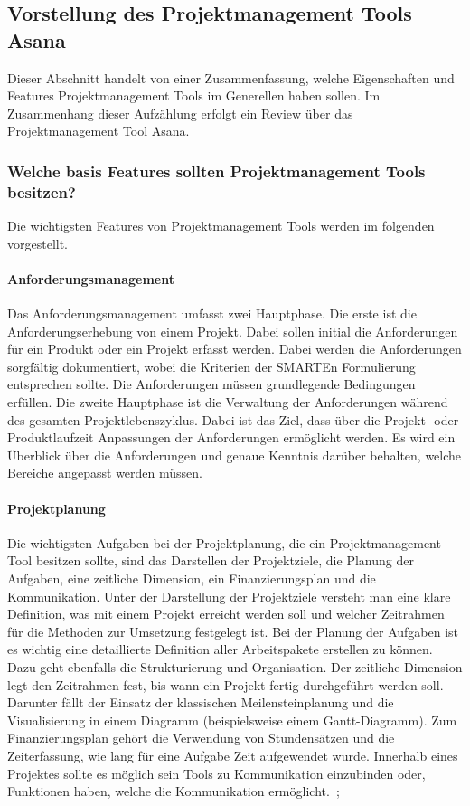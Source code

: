 \documentclass[sigconf, nonacm]{acmart}
\begin{document}
\subsection{Vorstellung des Projektmanagement Tools Asana}
Dieser Abschnitt handelt von einer Zusammenfassung, welche Eigenschaften und Features Projektmanagement Tools im Generellen haben sollen. Im Zusammenhang dieser Aufzählung erfolgt ein Review über das Projektmanagement Tool Asana.
\subsubsection{Welche basis Features sollten Projektmanagement Tools besitzen?}
Die wichtigsten Features von Projektmanagement Tools werden im folgenden vorgestellt.
\paragraph{Anforderungsmanagement}
Das Anforderungsmanagement umfasst zwei Hauptphase. Die erste ist die Anforderungserhebung von einem Projekt. Dabei sollen initial die Anforderungen für ein Produkt oder ein Projekt erfasst werden. Dabei werden die Anforderungen sorgfältig dokumentiert, wobei die Kriterien der SMARTEn Formulierung entsprechen sollte. Die Anforderungen müssen grundlegende Bedingungen erfüllen.
Die zweite Hauptphase ist die Verwaltung der Anforderungen während des gesamten Projektlebenszyklus.
Dabei ist das Ziel, dass über die Projekt- oder Produktlaufzeit Anpassungen der Anforderungen ermöglicht werden. Es wird ein Überblick über die Anforderungen und genaue Kenntnis darüber behalten, welche Bereiche angepasst werden müssen. ~\citep{venzmer_anforderungsmanagement-tool_2020}
\paragraph{Projektplanung}
Die wichtigsten Aufgaben bei der Projektplanung, die ein Projektmanagement Tool besitzen sollte, sind das Darstellen der Projektziele, die Planung der Aufgaben, eine zeitliche Dimension, ein Finanzierungsplan und die Kommunikation. Unter der Darstellung der Projektziele versteht man eine klare Definition, was mit einem Projekt erreicht werden soll und welcher Zeitrahmen für die Methoden zur Umsetzung festgelegt ist. Bei der Planung der Aufgaben ist es wichtig eine detaillierte Definition aller Arbeitspakete erstellen zu können. Dazu geht ebenfalls die Strukturierung und Organisation. Der zeitliche Dimension legt den Zeitrahmen fest, bis wann ein Projekt fertig durchgeführt werden soll. Darunter fällt der Einsatz der klassischen Meilensteinplanung und die Visualisierung in einem Diagramm (beispielsweise einem Gantt-Diagramm). Zum Finanzierungsplan gehört die Verwendung von Stundensätzen und die Zeiterfassung, wie lang für eine Aufgabe Zeit aufgewendet wurde. Innerhalb eines Projektes sollte es möglich sein Tools zu Kommunikation einzubinden oder, Funktionen haben, welche die Kommunikation ermöglicht.~\citep{venzmer_projektplaner-software_2020};
\end{document}
